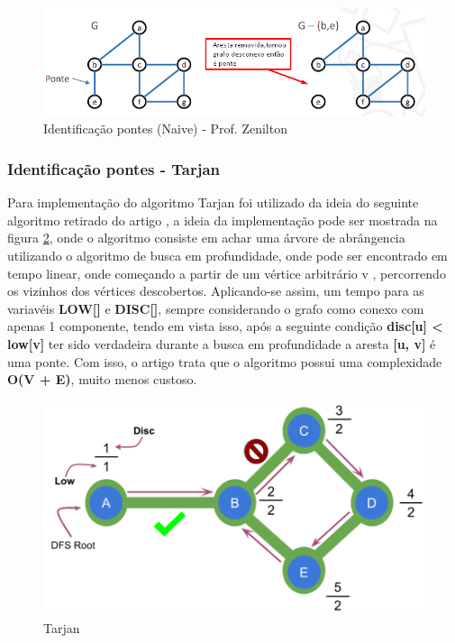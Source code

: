 \newpage
\begin{figure}[ht]
    \centering
    \includegraphics[width=.9\textwidth]{figuras/naive.png}
    \caption{Identificação pontes (Naive) - Prof. Zenilton}
    \label{fig:figure6}
\end{figure}

\subsubsection{\esp Identificação pontes - Tarjan}
Para implementação do algoritmo Tarjan foi utilizado da ideia do seguinte algoritmo retirado do artigo \cite{tarjan}, a ideia da implementação pode ser mostrada na figura \ref{fig:figure9}, onde o algoritmo consiste em achar uma árvore de abrângencia \cite{spanning} utilizando o algoritmo de busca em profundidade, onde pode ser encontrado em tempo linear, onde começando a partir de um vértice arbitrário v , percorrendo os vizinhos dos vértices descobertos. Aplicando-se assim, um tempo para as variavéis \textbf{LOW[]} e \textbf{DISC[]}, sempre considerando o grafo como conexo com apenas 1 componente, tendo em vista isso, após a seguinte condição \textbf{disc[u] < low[v]} ter sido verdadeira durante a busca em profundidade a aresta \textbf{[u, v]} é uma ponte. Com isso, o artigo trata que o algoritmo possui uma complexidade \textbf{O(V + E)}, muito menos custoso.

\begin{figure}[ht]
    \centering
    \includegraphics[width=.8\textwidth]{figuras/tarjan_1974.png}
    \caption{Tarjan \cite{tarjan_code}}
    \label{fig:figure9}
\end{figure}

